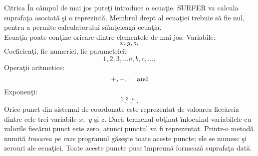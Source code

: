 \begin{surferPage}{Citrica}
\^In c\^ampul de mai jos pute\c ti introduce o ecua\c tie. SURFER va calcula suprafa\c ta asociat\u a \c si o reprezint\u a. Membrul drept al ecua\c tiei trebuie s\u a fie nul, pentru a permite calculatorului s\u a\^{\i}n\c teleag\u a ecua\c tia.\\
Ecua\c tia poate con\c tine oricare dintre elementele de mai jos:
\newline
Variabile:
\[x, y, z, \]
Coeficien\c ti, fie numerici, fie parametrici:
\[1, 2, 3, \dots a, b, c, \dots, \]
Opera\c tii aritmetice:
\[+,  - , \cdot \quad \textnormal{and} \]
Exponen\c ti:
\[ ^2, ^3, ^n .\]
Orice punct din sistemul de coordonate este reprezentat de valoarea fiec\u areia dintre cele trei variabile $x,$ $y$ \c si $z.$ Dac\u a termenul ob\c tinut \^{\i}nlocuind variabilele cu valorile fiec\u arui punct este zero, atunci punctul va fi reprezentat. Printr-o metod\u a numit\u a \textit{trasarea pe raze} programul g\u ase\c ste toate aceste puncte; ele se numesc \c si zerouri ale ecua\c tiei. Toate aceste puncte puse \^{\i}mpreun\u a formeaz\u a suprafa\c ta dat\u a.
\end{surferPage}
